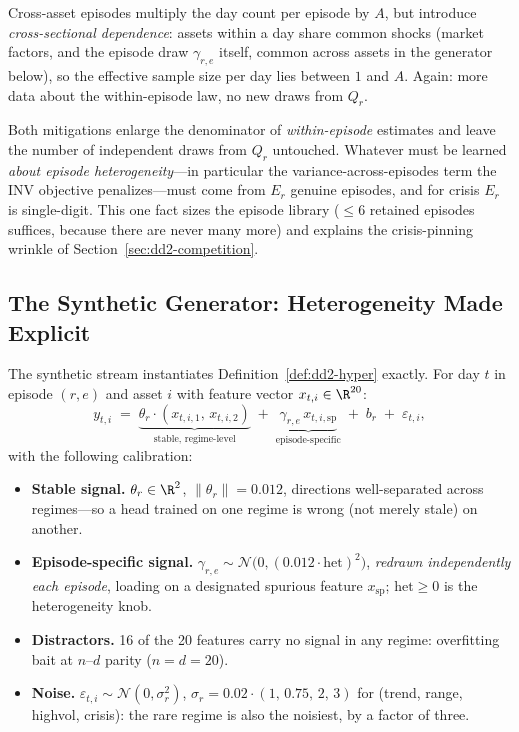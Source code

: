 Cross-asset episodes multiply the day count per episode by $A$, but
introduce \emph{cross-sectional dependence}: assets within a day share
common shocks (market factors, and the episode draw $\gamma_{r,e}$ itself,
common across assets in the generator below), so the effective sample size
per day lies between $1$ and $A$. Again: more data about the within-episode
law, no new draws from $Q_r$.

\begin{keypoint}
Both mitigations enlarge the denominator of \emph{within-episode} estimates
and leave the number of independent draws from $Q_r$ untouched. Whatever
must be learned \emph{about episode heterogeneity}---in particular the
variance-across-episodes term the INV objective penalizes---must come from
$E_r$ genuine episodes, and for \textsf{crisis} $E_r$ is single-digit. This
one fact sizes the episode library ($\le 6$ retained episodes suffices,
because there are never many more) and explains the crisis-pinning wrinkle
of Section~\ref{sec:dd2-competition}.
\end{keypoint}

\subsection{The Synthetic Generator: Heterogeneity Made Explicit}
\label{sec:dd2-generator}

The synthetic stream instantiates Definition~\ref{def:dd2-hyper} exactly. For
day $t$ in episode $(r,e)$ and asset $i$ with feature vector
$x_{t,i} \in \R^{20}$:
\begin{equation}
\label{eq:dd2-generator}
y_{t,i} \;=\;
\underbrace{\theta_r \cdot (x_{t,i,1},\, x_{t,i,2})}_{\text{stable, regime-level}}
\;+\;
\underbrace{\gamma_{r,e}\, x_{t,i,\mathrm{sp}}}_{\text{episode-specific}}
\;+\; b_r \;+\; \varepsilon_{t,i},
\end{equation}
with the following calibration:
\begin{itemize}
  \item \textbf{Stable signal.} $\theta_r \in \R^2$, $\|\theta_r\| = 0.012$,
        directions well-separated across regimes---so a head trained on one
        regime is wrong (not merely stale) on another.
  \item \textbf{Episode-specific signal.}
        $\gamma_{r,e} \sim \mathcal{N}\bigl(0, (0.012 \cdot \mathrm{het})^2\bigr)$,
        \emph{redrawn independently each episode}, loading on a designated
        spurious feature $x_{\mathrm{sp}}$; $\mathrm{het} \ge 0$ is the
        heterogeneity knob.
  \item \textbf{Distractors.} 16 of the 20 features carry no signal in any
        regime: overfitting bait at $n$--$d$ parity ($n = d = 20$).
  \item \textbf{Noise.} $\varepsilon_{t,i} \sim \mathcal{N}(0, \sigma_r^2)$,
        $\sigma_r = 0.02 \cdot (1,\, 0.75,\, 2,\, 3)$ for
        (\textsf{trend}, \textsf{range}, \textsf{highvol}, \textsf{crisis}):
        the rare regime is also the noisiest, by a factor of three.
\end{itemize}

